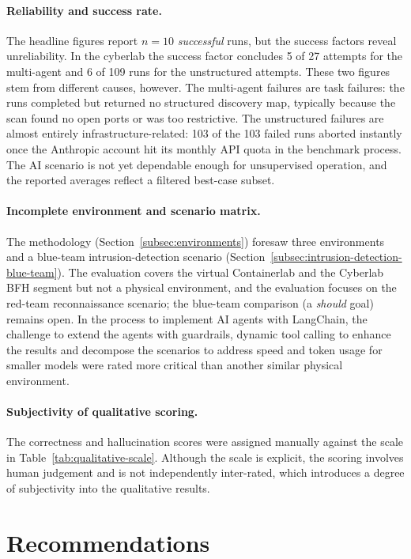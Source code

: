 \paragraph{Reliability and success rate.}
The headline figures report \(n = 10\) \emph{successful} runs,
but the success factors reveal unreliability.
In the cyberlab the success factor concludes 5 of 27 attempts for the multi-agent and 6 of 109 runs for the unstructured attempts.
These two figures stem from different causes, however.
The multi-agent failures are task failures: the runs completed but returned no structured discovery map, typically because the scan found no open ports or was too restrictive.
The unstructured failures are almost entirely infrastructure-related: 103 of the 103 failed runs aborted instantly once the \gls{Anthropic} account hit its monthly \gls{API} quota in the benchmark process.
The \gls{AI} scenario is not yet dependable enough for unsupervised operation, and the reported averages reflect a filtered best-case subset.

\paragraph{Incomplete environment and scenario matrix.}
The methodology (Section~\ref{subsec:environments}) foresaw three environments and a
blue-team intrusion-detection scenario (Section~\ref{subsec:intrusion-detection-blue-team}).
The evaluation covers the virtual \gls{Containerlab} and the Cyberlab BFH segment but not a physical environment,
and the evaluation focuses on the red-team reconnaissance scenario; the blue-team comparison (a \emph{should} goal) remains open.
In the process to implement \gls{AI} agents with LangChain, the challenge to extend the agents with guardrails, dynamic tool calling to enhance the results and
decompose the scenarios to address speed and token usage for smaller models were rated more critical than another similar physical environment.

\paragraph{Subjectivity of qualitative scoring.}
The correctness and hallucination scores were assigned manually against the scale in
Table~\ref{tab:qualitative-scale}.
Although the scale is explicit, the scoring involves human judgement and is not
independently inter-rated, which introduces a degree of subjectivity into the
qualitative results.

\section{Recommendations}\label{sec:discussion-recommendations}


